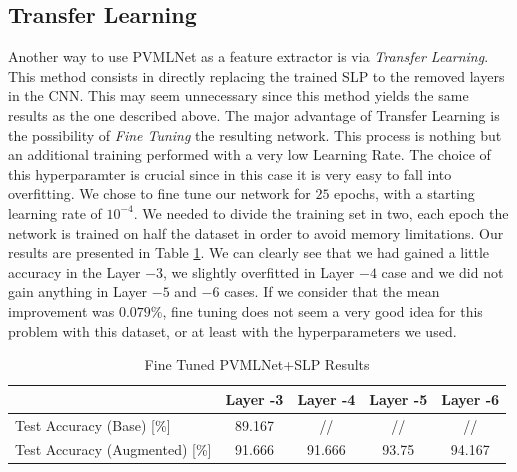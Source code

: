 \documentclass[10pt,a4paper]{report}
\begin{document}
\subsection{Transfer Learning}
Another way to use PVMLNet as a feature extractor is via \textit{Transfer Learning}. This method consists in directly replacing the trained SLP to the removed layers in the CNN. This may seem unnecessary since this method yields the same results as the one described above. The major advantage of Transfer Learning is the possibility of \textit{Fine Tuning} the resulting network. This process is nothing but an additional training performed with a very low Learning Rate. The choice of this hyperparamter is crucial since in this case it is very easy to fall into overfitting. We chose to fine tune our network for $25$ epochs, with a starting learning rate of $10^{-4}$. We needed to divide the training set in two, each epoch the network is trained on half the dataset in order to avoid memory limitations. Our results are presented in Table \ref{tab:ftft-pvmlnet}. We can clearly see that we had gained a little accuracy in the Layer $-3$, we slightly overfitted in Layer $-4$ case and we did not gain anything in Layer $-5$ and $-6$ cases. If we consider that the mean improvement was $0.079 \%$, fine tuning does not seem a very good idea for this problem with this dataset, or at least with the hyperparameters we used. 
\begin{table}[!ht]
\centering
\begin{tabular}{|l|c|c|c|c|}
\hline
                                   & Layer -3 & Layer -4 & Layer -5 & Layer -6 \\ \hline
Test Accuracy (Base) {[}\%{]}      & 89.167   & //       & //       & //       \\ \hline
Test Accuracy (Augmented) {[}\%{]} & 91.666   & 91.666   & 93.75    & 94.167   \\ \hline
\end{tabular}
\caption{Fine Tuned PVMLNet+SLP Results}
\label{tab:ftft-pvmlnet}
\end{table} 
\end{document}
